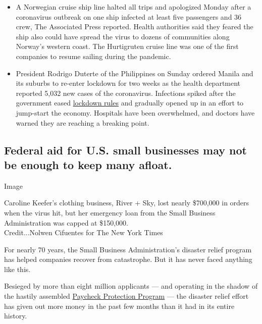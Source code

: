 \begin{itemize}
\item
  A Norwegian cruise ship line halted all trips and apologized Monday
  after a coronavirus outbreak on one ship infected at least five
  passengers and 36 crew, The Associated Press reported. Health
  authorities said they feared the ship also could have spread the virus
  to dozens of communities along Norway's western coast. The Hurtigruten
  cruise line was one of the first companies to resume sailing during
  the pandemic.
\item
  President Rodrigo Duterte of the Philippines on Sunday ordered Manila
  and its suburbs to re-enter lockdown for two weeks as the health
  department reported 5,032 new cases of the coronavirus. Infections
  spiked after the government eased
  \href{https://www.nytimes.com/2020/04/15/world/asia/manila-coronavirus-lockdown-slum.html}{lockdown
  rules} and gradually opened up in an effort to jump-start the economy.
  Hospitals have been overwhelmed, and doctors have warned they are
  reaching a breaking point.
\end{itemize}

\hypertarget{federal-aid-for-us-small-businesses-may-not-be-enough-to-keep-many-afloat}{%
\subsection{Federal aid for U.S. small businesses may not be enough to
keep many
afloat.}\label{federal-aid-for-us-small-businesses-may-not-be-enough-to-keep-many-afloat}}

Image

Caroline Keefer's clothing business, River + Sky, lost nearly \$700,000
in orders when the virus hit, but her emergency loan from the Small
Business Administration was capped at \$150,000.\\

Credit...Nolwen Cifuentes for The New York Times

For nearly 70 years, the Small Business Administration's disaster relief
program has helped companies recover from catastrophe. But it has never
faced anything like this.

Besieged by more than eight million applicants --- and operating in the
shadow of the hastily assembled
\href{https://www.nytimes.com/2020/04/26/business/ppp-small-business-loans.html}{Paycheck
Protection Program} --- the disaster relief effort has given out more
money in the past few months than it had in its entire history.

